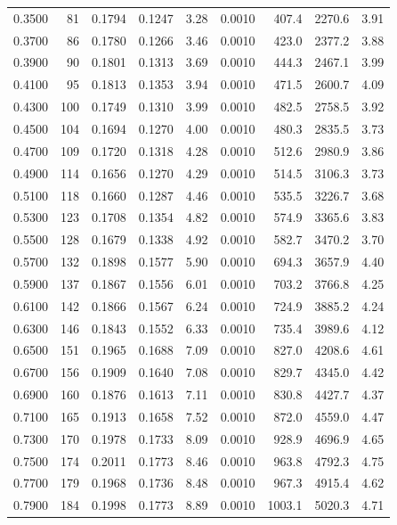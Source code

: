 {\begin{longtable}{lrrrrrrrr}
  0.3500 & 81 & 0.1794 & 0.1247 & 3.28 & 0.0010 & 407.4 & 2270.6 & 3.91 \\
  0.3700 & 86 & 0.1780 & 0.1266 & 3.46 & 0.0010 & 423.0 & 2377.2 & 3.88 \\
  0.3900 & 90 & 0.1801 & 0.1313 & 3.69 & 0.0010 & 444.3 & 2467.1 & 3.99 \\
  0.4100 & 95 & 0.1813 & 0.1353 & 3.94 & 0.0010 & 471.5 & 2600.7 & 4.09 \\
  0.4300 & 100 & 0.1749 & 0.1310 & 3.99 & 0.0010 & 482.5 & 2758.5 & 3.92 \\
  0.4500 & 104 & 0.1694 & 0.1270 & 4.00 & 0.0010 & 480.3 & 2835.5 & 3.73 \\
  0.4700 & 109 & 0.1720 & 0.1318 & 4.28 & 0.0010 & 512.6 & 2980.9 & 3.86 \\
  0.4900 & 114 & 0.1656 & 0.1270 & 4.29 & 0.0010 & 514.5 & 3106.3 & 3.73 \\
  0.5100 & 118 & 0.1660 & 0.1287 & 4.46 & 0.0010 & 535.5 & 3226.7 & 3.68 \\
  0.5300 & 123 & 0.1708 & 0.1354 & 4.82 & 0.0010 & 574.9 & 3365.6 & 3.83 \\
  0.5500 & 128 & 0.1679 & 0.1338 & 4.92 & 0.0010 & 582.7 & 3470.2 & 3.70 \\
  0.5700 & 132 & 0.1898 & 0.1577 & 5.90 & 0.0010 & 694.3 & 3657.9 & 4.40 \\
  0.5900 & 137 & 0.1867 & 0.1556 & 6.01 & 0.0010 & 703.2 & 3766.8 & 4.25 \\
  0.6100 & 142 & 0.1866 & 0.1567 & 6.24 & 0.0010 & 724.9 & 3885.2 & 4.24 \\
  0.6300 & 146 & 0.1843 & 0.1552 & 6.33 & 0.0010 & 735.4 & 3989.6 & 4.12 \\
  0.6500 & 151 & 0.1965 & 0.1688 & 7.09 & 0.0010 & 827.0 & 4208.6 & 4.61 \\
  0.6700 & 156 & 0.1909 & 0.1640 & 7.08 & 0.0010 & 829.7 & 4345.0 & 4.42 \\
  0.6900 & 160 & 0.1876 & 0.1613 & 7.11 & 0.0010 & 830.8 & 4427.7 & 4.37 \\
  0.7100 & 165 & 0.1913 & 0.1658 & 7.52 & 0.0010 & 872.0 & 4559.0 & 4.47 \\
  0.7300 & 170 & 0.1978 & 0.1733 & 8.09 & 0.0010 & 928.9 & 4696.9 & 4.65 \\
  0.7500 & 174 & 0.2011 & 0.1773 & 8.46 & 0.0010 & 963.8 & 4792.3 & 4.75 \\
  0.7700 & 179 & 0.1968 & 0.1736 & 8.48 & 0.0010 & 967.3 & 4915.4 & 4.62 \\
  0.7900 & 184 & 0.1998 & 0.1773 & 8.89 & 0.0010 & 1003.1 & 5020.3 & 4.71 \\

\end{longtable}}
